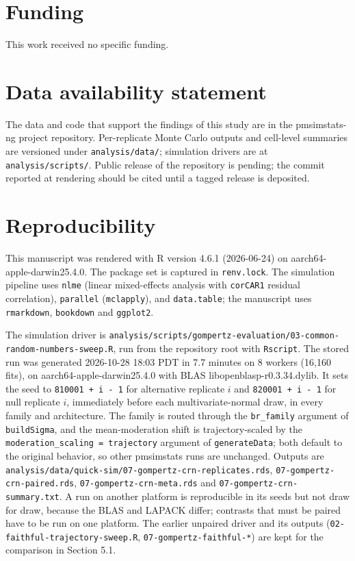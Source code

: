 \documentclass[
  11pt,
]{article}
\begin{document}
\section{Funding}\label{funding}

This work received no specific funding.

\section{Data availability statement}\label{data-availability-statement}

The data and code that support the findings of this study are in the
pmsimstats-ng project repository. Per-replicate Monte Carlo outputs
and cell-level summaries are versioned under \texttt{analysis/data/};
simulation drivers are at \texttt{analysis/scripts/}. Public release of the
repository is pending; the commit reported at rendering should be
cited until a tagged release is deposited.

\section{Reproducibility}\label{reproducibility}

This manuscript was rendered with R version 4.6.1 (2026-06-24) on
aarch64-apple-darwin25.4.0. The package set is captured in \texttt{renv.lock}.
The simulation pipeline uses \texttt{nlme} (linear mixed-effects analysis
with \texttt{corCAR1} residual correlation), \texttt{parallel} (\texttt{mclapply}), and
\texttt{data.table}; the manuscript uses \texttt{rmarkdown}, \texttt{bookdown} and
\texttt{ggplot2}.

The simulation driver is
\texttt{analysis/scripts/gompertz-evaluation/03-common-random-numbers-sweep.R},
run from the repository root with \texttt{Rscript}.
The stored run was generated 2026-10-28 18:03 PDT in 7.7 minutes on 8 workers (16,160 fits), on aarch64-apple-darwin25.4.0 with BLAS libopenblasp-r0.3.34.dylib.
It sets the seed to \texttt{810001\ +\ i\ -\ 1} for alternative replicate \(i\) and
\texttt{820001\ +\ i\ -\ 1} for null replicate \(i\), immediately before each
multivariate-normal draw, in every family and architecture. The family
is routed through the \texttt{br\_family} argument of \texttt{buildSigma}, and the
mean-moderation shift is trajectory-scaled by the
\texttt{moderation\_scaling\ =\ \textquotesingle{}trajectory\textquotesingle{}} argument of \texttt{generateData}; both
default to the original behavior, so other pmsimstats runs are
unchanged. Outputs are
\texttt{analysis/data/quick-sim/07-gompertz-crn-replicates.rds},
\texttt{07-gompertz-crn-paired.rds}, \texttt{07-gompertz-crn-meta.rds} and
\texttt{07-gompertz-crn-summary.txt}. A run on another platform is
reproducible in its seeds but not draw for draw, because the BLAS and
LAPACK differ; contrasts that must be paired have to be run on one
platform. The earlier unpaired driver and its outputs
(\texttt{02-faithful-trajectory-sweep.R}, \texttt{07-gompertz-faithful-*}) are kept
for the comparison in Section 5.1.
\end{document}
